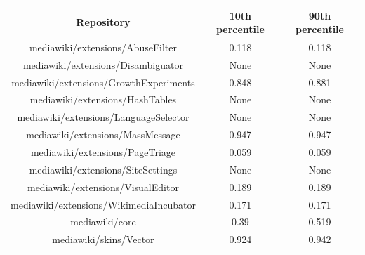 \begin{table}[H]
    \centering
    \begin{tabular}{@{}c c c@{}} 
    \hline
    \textbf{Repository} & \textbf{10th percentile} & \textbf{90th percentile} \\
    \hline
mediawiki/extensions/AbuseFilter & 0.118 & 0.118 \\
mediawiki/extensions/Disambiguator & None & None \\
mediawiki/extensions/GrowthExperiments & 0.848 & 0.881 \\
mediawiki/extensions/HashTables & None & None \\
mediawiki/extensions/LanguageSelector & None & None \\
mediawiki/extensions/MassMessage & 0.947 & 0.947 \\
mediawiki/extensions/PageTriage & 0.059 & 0.059 \\
mediawiki/extensions/SiteSettings & None & None \\
mediawiki/extensions/VisualEditor & 0.189 & 0.189 \\
mediawiki/extensions/WikimediaIncubator & 0.171 & 0.171 \\
mediawiki/core & 0.39 & 0.519 \\
mediawiki/skins/Vector & 0.924 & 0.942 \\
    \hline
\end{tabular}
    \label{table:accuracy-score-open-voted-appendix-c-part-4}
\end{table}